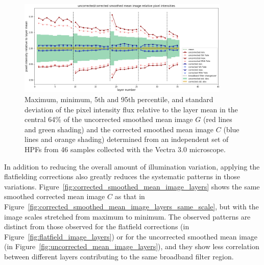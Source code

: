 \documentclass[letterpaper,11pt]{article}
\newcommand{\reffig}[1]{Figure~\ref{#1}}
\begin{document}
\begin{figure}[!ht]
\centering
\includegraphics[width=0.90\textwidth]{images/results/illumination_variation_reduction}
\caption{\footnotesize Maximum, minimum, 5th and 95th percentile, and standard deviation of the pixel intensity flux relative to the layer mean in the central 64\% of the uncorrected smoothed mean image $G$ (red lines and green shading) and the corrected smoothed mean image $C$ (blue lines and orange shading) determined from an independent set of HPFs from 46 samples collected with the Vectra 3.0 microscope.}
\label{fig:illumination_variation_reduction}
\end{figure} 

In addition to reducing the overall amount of illumination variation, applying the flatfielding corrections also greatly reduces the systematic patterns in those variations. \reffig{fig:corrected_smoothed_mean_image_layers} shows the same smoothed corrected mean image $C$ as that in \reffig{fig:corrected_smoothed_mean_image_layers_same_scale}, but with the image scales stretched from maximum to minimum. The observed patterns are distinct from those observed for the flatfield corrections (in \reffig{fig:flatfield_image_layers}) or for the uncorrected smoothed mean image (in \reffig{fig:uncorrected_mean_image_layers}), and they show less correlation between different layers contributing to the same broadband filter region.
\end{document}
